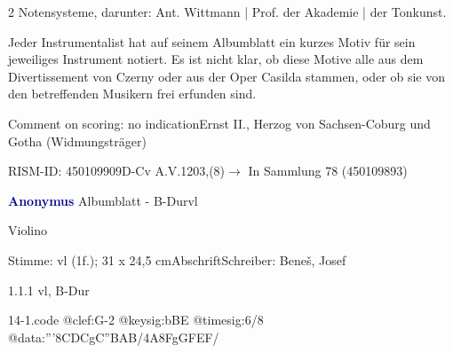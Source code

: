 \documentclass[a4paper, twocolumn, 11pt]{book}
\begin{document}
\newline %
\par 2 Notensysteme, darunter: Ant. Wittmann | Prof. der Akademie | der Tonkunst.
\par Jeder Instrumentalist hat auf seinem Albumblatt ein kurzes Motiv für sein jeweiliges Instrument notiert. Es ist nicht klar, ob diese Motive alle aus dem {\textquotedbl}Divertissement{\textquotedbl} von Czerny oder aus der Oper {\textquotedbl}Casilda{\textquotedbl} stammen, oder ob sie von den betreffenden Musikern frei erfunden sind.
\par Comment on scoring: no indication\newline Ernst II., Herzog von Sachsen-Coburg und Gotha  (Widmungsträger)
\par RISM-ID: 450109909\newline D-Cv  A.V.1203,(8)\newline $\rightarrow$ In Sammlung 78 (450109893)
      
\par \vspace{16pt} \textcolor{darkblue}{\textbf{Anonymus  }}\hfillplus{[14]}\newline Albumblatt - B-Dur\newline vl
\par \begin{itshape}[heading:] Violino\end{itshape} 
\par \textcolor{darkblue}{}  Stimme: vl  (1f.); 31 x 24,5 cm\newline Abschrift\newline Schreiber: Beneš, Josef
\par 1.1.1  vl, B-Dur  
\begin{filecontents*}{14-1.code}
@clef:G-2
@keysig:bBE
@timesig:6/8
@data:'''8{CDC}gC{''BAB}/4A8FgG{FEF}/
\end{filecontents*}
\end{document}
